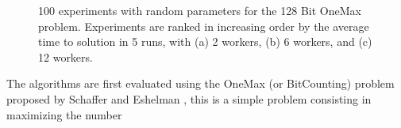\documentclass[conference]{IEEEtran}
\begin{document}
\begin{figure}[h!tb]
    \centering

    \caption{100 experiments with random parameters for the 128 Bit OneMax problem.
    Experiments are ranked in increasing order by the average time to solution in 5 runs, with
    (a) 2 workers, (b) 6 workers, and (c) 12 workers.}
    \label{fig:effort}
  \end{figure}
The algorithms are first evaluated using the OneMax (or BitCounting) problem proposed by
Schaffer and Eshelman \cite{SE91}, this is a simple problem consisting in maximizing the number
\end{document}
